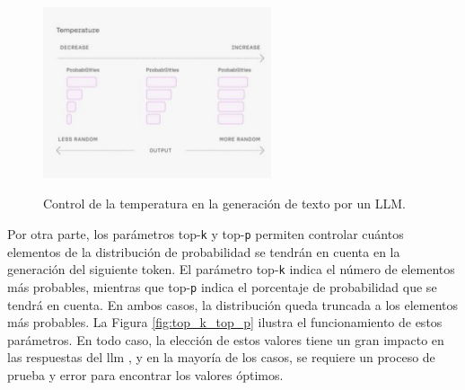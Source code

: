 \begin{figure}[H]
    \caption[Control de la temperatura en la generación de texto por un LLM]{Control de la temperatura en la generación de texto por un LLM.}
    \centering
    \includegraphics[width=0.6\textwidth]{./figuras/temperatura.png}
    \label{fig:temperatura}
\end{figure}

Por otra parte, los parámetros top-\texttt{k} y top-\texttt{p} permiten controlar cuántos elementos de la distribución de probabilidad se tendrán en cuenta en la generación del siguiente token. El parámetro top-\texttt{k} indica el número de elementos más probables, mientras que top-\texttt{p} indica el porcentaje de probabilidad que se tendrá en cuenta. En ambos casos, la distribución queda truncada a los elementos más probables. La Figura \ref{fig:top_k_top_p} ilustra el funcionamiento de estos parámetros. En todo caso, la elección de estos valores tiene un gran impacto en las respuestas del \gls{llm} \citep{holtzmanCuriousCaseNeural2020,chamandFinetuneYourClassifier2022,wangHyperparameterOptimizationAlgorithm2022,wangCostEffectiveHyperparameterOptimization2023}, y en la mayoría de los casos, se requiere un proceso de prueba y error para encontrar los valores óptimos.


